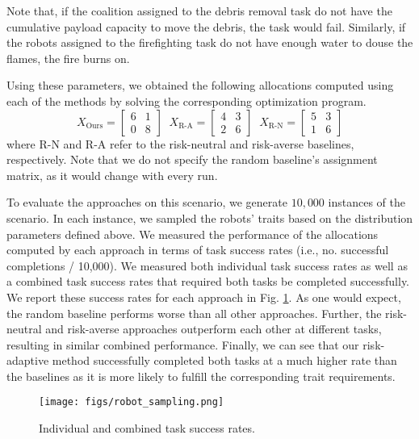 \documentclass[letterpaper, 10 pt, conference]{ieeeconf}  %
\newcommand{\red}[1]{\color{red} #1 \color{black}}
\begin{document}
Note that, if the coalition assigned to the debris removal task do not have the cumulative payload capacity to move the debris, the task would fail. Similarly, if the robots assigned to the firefighting task do not have enough water to douse the flames, the fire burns on.

Using these parameters, we obtained the following allocations computed using each of the methods by solving the corresponding optimization program.
$$X_\text{Ours} = \begin{bmatrix} 6 & 1 \\ 0 & 8 \end{bmatrix} \;\; 
X_\text{R-A} = \begin{bmatrix} 4 & 3 \\ 2 & 6 \end{bmatrix} \;\;
X_\text{R-N} = \begin{bmatrix} 5 & 3 \\ 1 & 6 \end{bmatrix} $$
where R-N and R-A refer to the risk-neutral and risk-averse baselines, respectively. Note that we do not specify the random baseline's assignment matrix, as it would change with every run.

To evaluate the approaches on this scenario, we generate $10,000$ instances of the scenario. In each instance, we sampled the robots' traits based on the distribution parameters defined above. We measured the performance of the allocations computed by each approach in terms of task success rates (i.e., no. successful completions / 10,000). We measured both individual task success rates as well as a combined task success rates that required both tasks be completed successfully.
We report these success rates for each approach in Fig. \ref{fig:robotarium_success}. As one would expect, the random baseline performs worse than all other approaches. Further, the risk-neutral and risk-averse approaches outperform each other at different tasks, resulting in similar combined performance. Finally, we can see that our risk-adaptive method successfully completed both tasks at a much higher rate than the baselines as it is more likely to fulfill the corresponding trait requirements.

\begin{figure}[ht]
    \centering
    \texttt{[image: figs/robot\_sampling.png]}
    \caption{Individual and combined task success rates.}
    \label{fig:robotarium_success}
\end{figure}
\end{document}
